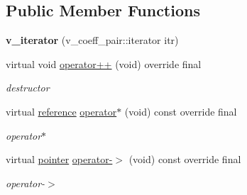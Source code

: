 \subsection*{Public Member Functions}
\begin{DoxyCompactItemize}
\item 
\mbox{\label{class_s_m_spp__di__unipi__it_1_1_linear_function_1_1v__iterator_a405d2b78fd36e5c1d8de46307f721685}} 
{\bfseries v\+\_\+iterator} (v\+\_\+coeff\+\_\+pair\+::iterator itr)
\item 
virtual void \mbox{\hyperlink{class_s_m_spp__di__unipi__it_1_1_linear_function_1_1v__iterator_af860fe44bc54c0cbca8e733ab0e954e0}{operator++}} (void) override final
\begin{DoxyCompactList}\small\item\em destructor \end{DoxyCompactList}\item 
\mbox{\label{class_s_m_spp__di__unipi__it_1_1_linear_function_1_1v__iterator_aea4d50ffc7b90999612dafe5edb8ca59}} 
virtual \mbox{\hyperlink{class_s_m_spp__di__unipi__it_1_1_variable}{reference}} \mbox{\hyperlink{class_s_m_spp__di__unipi__it_1_1_linear_function_1_1v__iterator_aea4d50ffc7b90999612dafe5edb8ca59}{operator$\ast$}} (void) const override final
\begin{DoxyCompactList}\small\item\em operator$\ast$ \end{DoxyCompactList}\item 
\mbox{\label{class_s_m_spp__di__unipi__it_1_1_linear_function_1_1v__iterator_af090a4094bcbcae8966745a92278976b}} 
virtual \mbox{\hyperlink{class_s_m_spp__di__unipi__it_1_1_variable}{pointer}} \mbox{\hyperlink{class_s_m_spp__di__unipi__it_1_1_linear_function_1_1v__iterator_af090a4094bcbcae8966745a92278976b}{operator-\/$>$}} (void) const override final
\begin{DoxyCompactList}\small\item\em operator-\/$>$ \end{DoxyCompactList}\item 
\mbox{\label{class_s_m_spp__di__unipi__it_1_1_linear_function_1_1v__iterator_a0dc0c588cd40c35cea17618336da30c3}} 

\end{DoxyCompactItemize}
